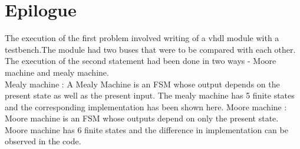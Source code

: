\documentclass[11pt]{report}
\begin{document}
	\pagebreak
\section{Epilogue}
The execution of the first problem involved writing of a vhdl module with a testbench.The module had two buses that were to be compared with each other.
The execution of the second statement had been done in two ways - Moore machine and mealy machine. \\ 
Mealy machine : 
A Mealy Machine is an FSM whose output depends on the present state as well as the present input. The mealy machine has 5 finite states and the corresponding implementation has been shown here.
Moore machine :
Moore machine is an FSM whose outputs depend on only the present state. Moore machine has 6 finite states and the difference in implementation can be observed in the code. 


\nocite{*}
\end{document}

